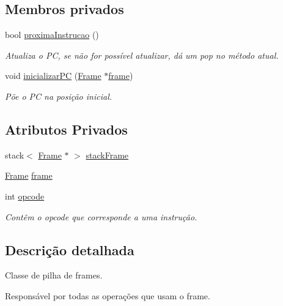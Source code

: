 \subsection*{Membros privados}
\begin{DoxyCompactItemize}
\item 
bool \hyperlink{classPilhaJVM_a914a4707e58e23e8913fcdc0c53f8c5c}{proxima\+Instrucao} ()
\begin{DoxyCompactList}\small\item\em Atualiza o PC, se não for possível atualizar, dá um pop no método atual. \end{DoxyCompactList}\item 
void \hyperlink{classPilhaJVM_a08adb78983b512cf3d97becfa2e9a5f0}{inicializar\+PC} (\hyperlink{PilhaJVM_8h_acc380914b41a084dcc8e4b38fb200145}{Frame} $\ast$\hyperlink{classPilhaJVM_adebac9c22fbb328afca1d2a98e6d486c}{frame})
\begin{DoxyCompactList}\small\item\em Põe o PC na posição inicial. \end{DoxyCompactList}\end{DoxyCompactItemize}
\subsection*{Atributos Privados}
\begin{DoxyCompactItemize}
\item 
stack$<$ \hyperlink{PilhaJVM_8h_acc380914b41a084dcc8e4b38fb200145}{Frame} $\ast$ $>$ \hyperlink{classPilhaJVM_a4d70c8b3d6fbddb38e943dc8b1a00c2d}{stack\+Frame}
\item 
\hyperlink{PilhaJVM_8h_acc380914b41a084dcc8e4b38fb200145}{Frame} \hyperlink{classPilhaJVM_adebac9c22fbb328afca1d2a98e6d486c}{frame}
\item 
int \hyperlink{classPilhaJVM_a90e6f9da43b72798ea0331c57b72af09}{opcode}
\begin{DoxyCompactList}\small\item\em Contêm o opcode que corresponde a uma instrução. \end{DoxyCompactList}\end{DoxyCompactItemize}


\subsection{Descrição detalhada}
Classe de pilha de frames. 

Responsável por todas as operações que usam o frame. 

